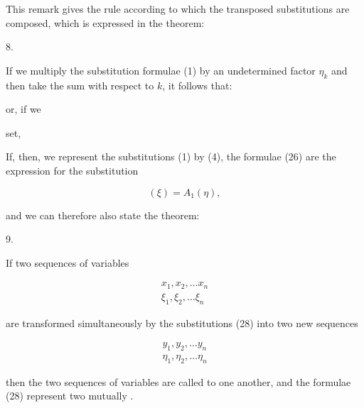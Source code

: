 This remark gives the rule according to which the transposed substitutions are composed, which is expressed in the theorem:

\par
8.\enspace{}


If we multiply the substitution formulae (1) by an undetermined factor $\eta_k$ and then take the sum with respect to $k$, it follows that:


or, if we


set,


If, then, we represent the substitutions (1) by (4), the formulae (26) are the expression for the substitution

\[
(\xi) = A_1(\eta),
\]

and we can therefore also state the theorem:

\par
9.\enspace{}




If two sequences of variables

\[
\begin{gathered} x_1, x_2, \ldots x_n \\ \xi_1, \xi_2, \ldots \xi_n \end{gathered}
\]

are transformed simultaneously by the substitutions (28) into two new sequences

\[
\begin{gathered} y_1, y_2, \ldots y_n \\ \eta_1, \eta_2, \ldots \eta_n \end{gathered}
\]

then the two sequences of variables are called  to one another, and the formulae (28) represent two mutually .
